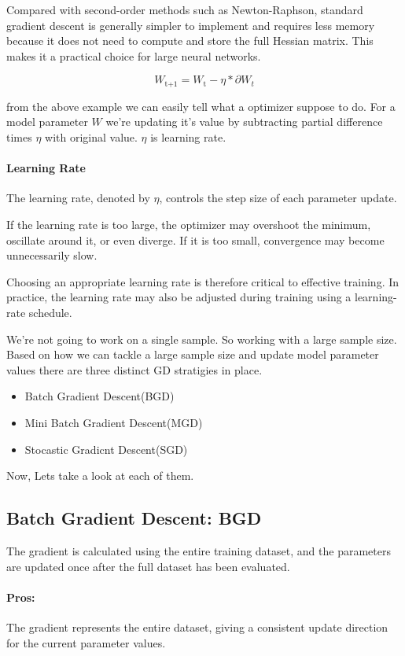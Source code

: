 Compared with second-order methods such as
Newton-Raphson, standard gradient descent is
generally simpler to implement and requires less
memory because it does not need to compute and
store the full Hessian matrix. This makes it a
practical choice for large neural networks.

\[ W_\text{t+1} = W_\text{t} - \eta * \partial{W_t} \]

from the above example we can easily tell
what a optimizer suppose to do. For a
model parameter $W$ we're updating it's value
by subtracting partial difference times $\eta$
with original value. $\eta$ is learning rate.

\paragraph{Learning Rate}
The learning rate, denoted by $\eta$, controls the
step size of each parameter update.

If the learning rate is too large, the optimizer
may overshoot the minimum, oscillate around it,
or even diverge. If it is too small, convergence
may become unnecessarily slow.

Choosing an appropriate learning rate is therefore
critical to effective training. In practice, the
learning rate may also be adjusted during training
using a learning-rate schedule.

We're not going to work on a single sample.
So working with a large sample size. Based
on how we can tackle a large sample size
and update model parameter values there are
three distinct GD stratigies in place.

\begin{itemize}
    \item Batch Gradient Descent(BGD)
    \item Mini Batch Gradient Descent(MGD)
    \item Stocastic Gradicnt Descent(SGD)
\end{itemize}

Now, Lets take a look at each of them.

\subsection{Batch Gradient Descent: BGD}
The gradient is calculated using the entire
training dataset, and the parameters are
updated once after the full dataset has
been evaluated.

\paragraph{Pros:} The gradient represents
the entire dataset, giving a consistent
update direction for the current parameter
values.

